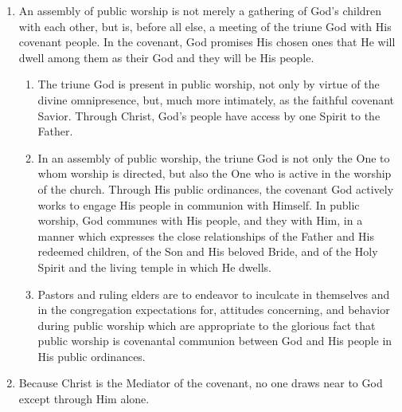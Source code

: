 \documentclass[
]{book}
\providecommand{\tightlist}{%
  \setlength{\itemsep}{0pt}\setlength{\parskip}{0pt}}
\begin{document}
\begin{enumerate}
\def\labelenumi{\arabic{enumi}.}
\tightlist
\item
  \protect\hypertarget{52}{\href{}{}}An assembly of public worship is not merely a gathering of God's children with each other, but is, before all else, a meeting of the triune God with His covenant people. In the covenant, God promises His chosen ones that He will dwell among them as their God and they will be His people.

  \begin{enumerate}
  \def\labelenumii{\alph{enumii}.}
  \tightlist
  \item
    The triune God is present in public worship, not only by virtue of the divine omnipresence, but, much more intimately, as the faithful covenant Savior. Through Christ, God's people have access by one Spirit to the Father.
  \item
    In an assembly of public worship, the triune God is not only the One to whom worship is directed, but also the One who is active in the worship of the church. Through His public ordinances, the covenant God actively works to engage His people in communion with Himself. In public worship, God communes with His people, and they with Him, in a manner which expresses the close relationships of the Father and His redeemed children, of the Son and His beloved Bride, and of the Holy Spirit and the living temple in which He dwells.
  \item
    Pastors and ruling elders are to endeavor to inculcate in themselves and in the congregation expectations for, attitudes concerning, and behavior during public worship which are appropriate to the glorious fact that public worship is covenantal communion between God and His people in His public ordinances.
  \end{enumerate}
\item
  Because Christ is the Mediator of the covenant, no one draws near to God except through Him alone.


\end{enumerate}
\end{document}
